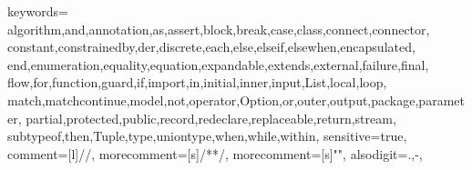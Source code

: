 {
  keywords={
    algorithm,and,annotation,as,assert,block,break,case,class,connect,connector,
    constant,constrainedby,der,discrete,each,else,elseif,elsewhen,encapsulated,
    end,enumeration,equality,equation,expandable,extends,external,failure,final,
    flow,for,function,guard,if,import,in,initial,inner,input,List,local,loop,
    match,matchcontinue,model,not,operator,Option,or,outer,output,package,parameter,
    partial,protected,public,record,redeclare,replaceable,return,stream,
    subtypeof,then,Tuple,type,uniontype,when,while,within},
  sensitive=true,
  comment=[l]{//},
  morecomment=[s]{/*}{*/},
  morecomment=[s]{"}{"},
  alsodigit={.,-},
}

\lstset{breaklines=true,language=modelica,basicstyle=\ttfamily}
\lstset{keywordstyle = \bf}
